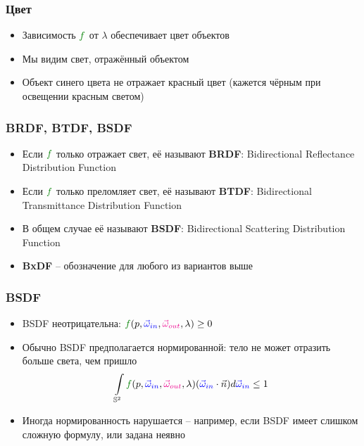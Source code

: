 \documentclass[handout,10pt]{beamer}
\begin{document}
\begin{frame}[fragile]
\frametitle{Цвет}
\begin{itemize}
\item Зависимость \begin{math}{\color{green}f}\end{math} от \begin{math}\lambda\end{math} обеспечивает цвет объектов
\pause
\item Мы видим свет, отражённый объектом
\pause
\item Объект синего цвета не отражает красный цвет (кажется чёрным при освещении красным светом)
\end{itemize}
\end{frame}

\begin{frame}[fragile]
\frametitle{BRDF, BTDF, BSDF}
\begin{itemize}
\item Если \begin{math}{\color{green}f}\end{math} только отражает свет, её называют \textbf{BRDF}: Bidirectional Reflectance Distribution Function
\pause 
\item Если \begin{math}{\color{green}f}\end{math} только преломляет свет, её называют \textbf{BTDF}: Bidirectional Transmittance Distribution Function
\pause 
\item В общем случае её называют \textbf{BSDF}: Bidirectional Scattering Distribution Function
\pause 
\item \textbf{BxDF} -- обозначение для любого из вариантов выше
\end{itemize}
\end{frame}

\begin{frame}[fragile]
\frametitle{BSDF}
\begin{itemize}
\item BSDF неотрицательна: \begin{math}{\color{green}f}(p, {\color{blue}\vec\omega_{in}}, {\color{magenta}\vec\omega_{out}}, \lambda)\geq 0\end{math}
\pause
\item Обычно BSDF предполагается нормированной: тело не может отразить больше света, чем пришло
\begin{equation*}
\int\limits_{\mathbb S^2} {\color{green}f}(p, {\color{blue}\vec\omega_{in}}, {\color{magenta}\vec\omega_{out}}, \lambda)({\color{blue}\vec\omega_{in}} \cdot \vec{n}) d{\color{blue}\vec\omega_{in}} \leq 1
\end{equation*}
\pause
\item Иногда нормированность нарушается -- например, если BSDF имеет слишком сложную формулу, или задана неявно
\end{itemize}
\end{frame}
\end{document}
